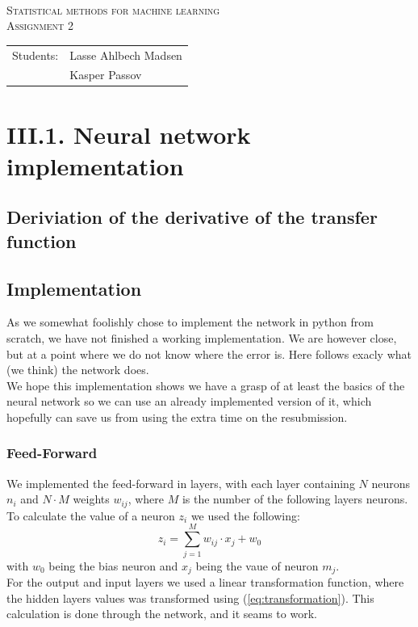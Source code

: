 \documentclass{article}
\begin{document}
\begin{titlepage}
\begin{center}
    \hline \\[0.2cm]
\textsc{\Large Statistical methods for machine learning}\\[0.5cm]
\textsc{\large Assignment 2}\\[0.5cm]
    \hline
    \hline
\vspace{2 cm}
\begin{tabular}{ll}
Students: & Lasse Ahlbech Madsen \\
          & Kasper Passov\\
\end{tabular}
\end{center}
\vspace{5 cm}
\newpage
\end{titlepage}

\section{III.1. Neural network implementation}

\subsection{Deriviation of the derivative of the transfer function}

\newpage

\subsection{Implementation}

As we somewhat foolishly chose to implement the network in python from
scratch, we have not finished a working implementation. We are however
close, but at a point where we do not know where the error is. Here follows
exacly what (we think) the network does.\\ 
We hope this implementation
shows we have a grasp of at least the basics of the neural network so we
can use an already implemented version of it, which hopefully can save us
from using the extra time on the resubmission.

\subsubsection{Feed-Forward}
We implemented the feed-forward in layers, with each layer containing $N$ neurons $n_i$ and $N \cdot M$ weights $w_{ij}$, where $M$ is the number of the following layers neurons.\\
To calculate the value of a neuron $z_i$ we used the following:
\begin{equation}
    z_i = \sum_{j=1}^{M} w_{ij} \cdot x_{j} + w_0
\end{equation}
with $w_0$ being the bias neuron and $x_j$ being the vaue of neuron $m_j$.\\
For the output and input layers we used a linear transformation function, where the hidden layers values was transformed using (\ref{eq:transformation}).
This calculation is done through the network, and it seams to work.
\end{document}
